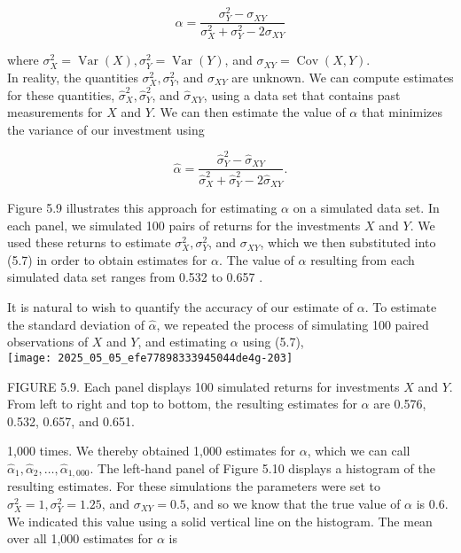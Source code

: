 \documentclass[10pt]{article}
\begin{document}
\begin{equation*}
\alpha=\frac{\sigma_{Y}^{2}-\sigma_{X Y}}{\sigma_{X}^{2}+\sigma_{Y}^{2}-2 \sigma_{X Y}} \tag{5.6}
\end{equation*}


where $\sigma_{X}^{2}=\operatorname{Var}(X), \sigma_{Y}^{2}=\operatorname{Var}(Y)$, and $\sigma_{X Y}=\operatorname{Cov}(X, Y)$.\\
In reality, the quantities $\sigma_{X}^{2}, \sigma_{Y}^{2}$, and $\sigma_{X Y}$ are unknown. We can compute estimates for these quantities, $\hat{\sigma}_{X}^{2}, \hat{\sigma}_{Y}^{2}$, and $\hat{\sigma}_{X Y}$, using a data set that contains past measurements for $X$ and $Y$. We can then estimate the value of $\alpha$ that minimizes the variance of our investment using


\begin{equation*}
\hat{\alpha}=\frac{\hat{\sigma}_{Y}^{2}-\hat{\sigma}_{X Y}}{\hat{\sigma}_{X}^{2}+\hat{\sigma}_{Y}^{2}-2 \hat{\sigma}_{X Y}} . \tag{5.7}
\end{equation*}


Figure 5.9 illustrates this approach for estimating $\alpha$ on a simulated data set. In each panel, we simulated 100 pairs of returns for the investments $X$ and $Y$. We used these returns to estimate $\sigma_{X}^{2}, \sigma_{Y}^{2}$, and $\sigma_{X Y}$, which we then substituted into (5.7) in order to obtain estimates for $\alpha$. The value of $\hat{\alpha}$ resulting from each simulated data set ranges from 0.532 to 0.657 .

It is natural to wish to quantify the accuracy of our estimate of $\alpha$. To estimate the standard deviation of $\hat{\alpha}$, we repeated the process of simulating 100 paired observations of $X$ and $Y$, and estimating $\alpha$ using (5.7),\\
\texttt{[image: 2025\_05\_05\_efe77898333945044de4g-203]}

FIGURE 5.9. Each panel displays 100 simulated returns for investments $X$ and $Y$. From left to right and top to bottom, the resulting estimates for $\alpha$ are 0.576, 0.532, 0.657, and 0.651.

1,000 times. We thereby obtained 1,000 estimates for $\alpha$, which we can call $\hat{\alpha}_{1}, \hat{\alpha}_{2}, \ldots, \hat{\alpha}_{1,000}$. The left-hand panel of Figure 5.10 displays a histogram of the resulting estimates. For these simulations the parameters were set to $\sigma_{X}^{2}=1, \sigma_{Y}^{2}=1.25$, and $\sigma_{X Y}=0.5$, and so we know that the true value of $\alpha$ is 0.6. We indicated this value using a solid vertical line on the histogram. The mean over all 1,000 estimates for $\alpha$ is
\end{document}
